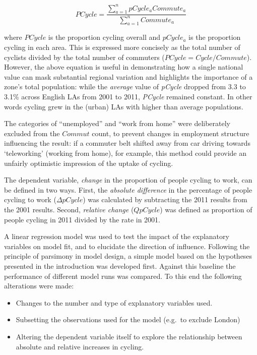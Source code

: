 \[PCycle =  \frac{\sum_{a=1}^n pCycle_a Commute_a}{\sum_{a=1}^n Commute_a} \]

where $PCycle$ is the proportion cycling overall and $pCycle_a$ is the
proportion cycling in each area. This is expressed more concisely as the
total number of cyclists divided by the total number of commuters
($PCycle = Cycle / Commute$). However, the above equation is useful in
demonstrating how a single national value can mask substantial regional
variation and highlights the importance of a zone's total population:
while the \emph{average} value of \emph{pCycle} dropped from 3.3 to
3.1\% across English LAs from 2001 to 2011, \emph{PCycle} remained
constant. In other words cycling grew in the (urban) LAs with higher
than average populations.

The categories of ``unemployed'' and ``work from home'' were
deliberately excluded from the $Commut$ count, to prevent changes in
employment structure influencing the result: if a commuter belt shifted
away from car driving towards `teleworking' (working from home), for
example, this method could provide an unfairly optimistic impression of
the uptake of cycling.

The dependent variable, \emph{change} in the proportion of people
cycling to work, can be defined in two ways. First, the \emph{absolute
difference} in the percentage of people cycling to work
($\Delta pCycle$) was calculated by subtracting the 2011 results from
the 2001 results. Second, \emph{relative change} ($Q pCycle$) was
defined as proportion of people cycling in 2011 divided by the rate in
2001.

A linear regression model was used to test the impact of the explanatory
variables on model fit, and to elucidate the direction of influence.
Following the principle of parsimony in model design, a simple model
based on the hypotheses presented in the introduction was developed
first. Against this baseline the performance of different model runs was
compared. To this end the following alterations were made:

\begin{itemize}
\itemsep1pt\parskip0pt
\item
  Changes to the number and type of explanatory variables used.
\item
  Subsetting the observations used for the model (e.g.~to exclude
  London)
\item
  Altering the dependent variable itself to explore the relationship
  between absolute and relative increases in cycling.
\end{itemize}

